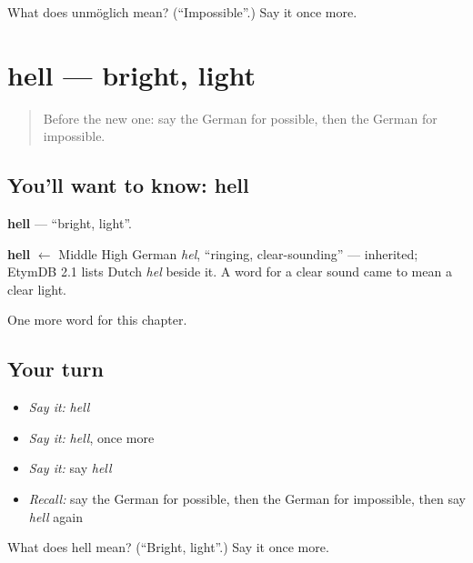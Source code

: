 \begin{tcolorbox}[breakable,colback=teal!4,colframe=teal!35!black,title={Before you move on}]
What does unmöglich mean? (\textquotedblleft{}Impossible\textquotedblright{}.) Say it once more.
\end{tcolorbox}
\section[hell]{hell — bright, light}

\label{lesson:GE-C168-hell}



\begin{quote}
Before the new one: say the German for possible, then the German for impossible.
\end{quote}

\subsection*{You'll want to know: hell}
\textbf{hell} — \textquotedblleft{}bright, light\textquotedblright{}.

\begin{cousinweb}
\textbf{hell} $\leftarrow$ Middle High German \emph{hel}, \textquotedblleft{}ringing, clear-sounding\textquotedblright{} — inherited; EtymDB 2.1 lists Dutch \emph{hel} beside it. A word for a clear sound came to mean a clear light.
\end{cousinweb}

\begin{grammarlens}[title={What you've built}]
One more word for this chapter.
\end{grammarlens}

\subsection*{Your turn}
\begin{itemize}
\raggedright
  \item \emph{Say it:} \emph{hell}
  \item \emph{Say it:} \emph{hell}, once more
  \item \emph{Say it:} say \emph{hell}
  \item \emph{Recall:} say the German for possible, then the German for impossible, then say \emph{hell} again
\end{itemize}

\begin{tcolorbox}[breakable,colback=teal!4,colframe=teal!35!black,title={Before you move on}]
What does hell mean? (\textquotedblleft{}Bright, light\textquotedblright{}.) Say it once more.
\end{tcolorbox}
